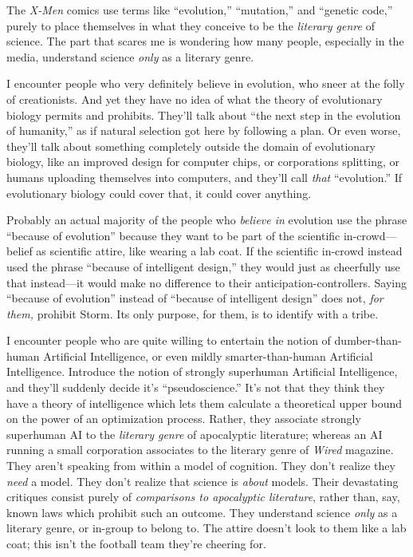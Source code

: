 {
 The \textit{X-Men} comics use terms like
``evolution,''
``mutation,'' and
``genetic code,'' purely to place
themselves in what they conceive to be the \textit{literary genre} of
science. The part that scares me is wondering how many people,
especially in the media, understand science \textit{only} as a literary
genre.}

{
 I encounter people who very definitely believe in evolution, who
sneer at the folly of creationists. And yet they have no idea of what
the theory of evolutionary biology permits and prohibits.
They'll talk about ``the next step in
the evolution of humanity,'' as if natural selection
got here by following a plan. Or even worse, they'll
talk about something completely outside the domain of evolutionary
biology, like an improved design for computer chips, or corporations
splitting, or humans uploading themselves into computers, and
they'll call \textit{that}
``evolution.'' If evolutionary
biology could cover that, it could cover anything.}

{
 Probably an actual majority of the people who \textit{believe in}
evolution use the phrase ``because of
evolution'' because they want to be part of the
scientific in-crowd---belief as scientific attire, like wearing a lab
coat. If the scientific in-crowd instead used the phrase
``because of intelligent design,''
they would just as cheerfully use that instead---it would make no
difference to their anticipation-controllers. Saying
``because of evolution'' instead of
``because of intelligent design''
does not, \textit{for them,} prohibit Storm. Its only purpose, for
them, is to identify with a tribe.}

{
 I encounter people who are quite willing to entertain the notion
of dumber-than-human Artificial Intelligence, or even mildly
smarter-than-human Artificial Intelligence. Introduce the notion of
strongly superhuman Artificial Intelligence, and
they'll suddenly decide it's
``pseudoscience.''
It's not that they think they have a theory of
intelligence which lets them calculate a theoretical upper bound on the
power of an optimization process. Rather, they associate strongly
superhuman AI to the \textit{literary genre} of apocalyptic literature;
whereas an AI running a small corporation associates to the literary
genre of \textit{Wired} magazine. They aren't speaking
from within a model of cognition. They don't realize
they \textit{need} a model. They don't realize that
science is \textit{about} models. Their devastating critiques consist
purely of \textit{comparisons to apocalyptic literature}, rather than,
say, known laws which prohibit such an outcome. They understand science
\textit{only} as a literary genre, or in-group to belong to. The attire
doesn't look to them like a lab coat; this
isn't the football team they're
cheering for.}

